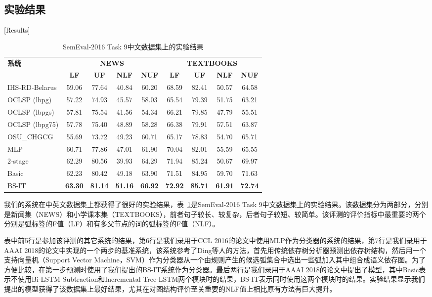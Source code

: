 \subsection{实验结果}[Results]


\begin{table}[htpb]
	\centering
	\small
	\renewcommand{\arraystretch}{1.2}
	\begin{tabular}{l||cc|cc||cc|cc}
		\hline
		\multirow{2}{*}{\bf 系统}&\multicolumn{4}{c}{\bf NEWS}&\multicolumn{4}{c}{\bf TEXTBOOKS}\\
		\cline{2-9}
		&\bf LF&\bf UF&\bf NLF&\bf NUF&\bf LF&\bf UF&\bf NLF&\bf NUF\\
		\hline
		IHS-RD-Belarus&59.06&77.64&40.84&60.20&68.59&82.41&50.57&64.58\\
		OCLSP (lbpg)&57.22&74.93&45.57&58.03&65.54&79.39&51.75&63.21\\
		OCLSP (lbpgs)&57.81&75.54&41.56&54.34&66.21&79.85&47.79&55.51\\
		OCLSP (lbpg75)&57.78&75.40&48.89&58.28&66.38&79.91&57.51&63.87\\
		OSU\_CHGCG&55.69&73.72&49.23&60.71&65.17&78.83&54.70&65.71\\
		\hline
		MLP & 60.71&77.86&47.01&61.90&70.04&82.01&55.59&65.55 \\ 
		\hline
		2-stage & 62.29&80.56&39.93&64.29&71.94&85.24&50.67&69.97 \\ 
		\hline
		Basic&62.23&80.42&49.18&63.90&71.51&84.95&59.70&71.63\\
		BS-IT&\bf63.30&\bf81.14&\bf51.16&\bf66.92&\bf72.92&\bf85.71&\bf61.91&\bf72.74\\
		\hline
	\end{tabular}
	\caption{SemEval-2016 Task 9中文数据集上的实验结果}
	\label{tbl:result-semeval16}
\end{table}

我们的系统在中英文数据集上都获得了很好的实验结果，表~\ref{tbl:result-semeval16}是SemEval-2016 Task 9中文数据集上的实验结果。该数据集分为两部分，分别是新闻集（NEWS）和小学课本集（TEXTBOOKS），前者句子较长、较复杂，后者句子较短、较简单。该评测的评价指标中最重要的两个分别是弧标签的F值（LF）和有多父节点的词的弧标签的F值（NLF）。

表中前5行是参加该评测的其它系统的结果，第6行是我们录用于CCL 2016的论文中使用MLP作为分类器的系统的结果，第7行是我们录用于AAAI 2018的论文中实现的一个两步的基准系统，该系统参考了Ding等人的方法，\cite{ding2014chinese}首先用传统依存树分析器预测出依存树结构，然后用一个支持向量机（Support Vector Machine，SVM）作为分类器从一个由规则产生的候选弧集合中选出一些弧加入其中组合成语义依存图。为了方便比较，在第一步预测时使用了我们提出的BS-IT系统作为分类器。最后两行是我们录用于AAAI 2018的论文中提出了模型，其中Basic表示不使用Bi-LSTM Subtraction和Incremental Tree-LSTM两个模块时的结果，BS-IT表示同时使用这两个模块时的结果。实验结果显示我们提出的模型获得了该数据集上最好结果，尤其在对图结构评价至关重要的NLF值上相比原有方法有巨大提升。

